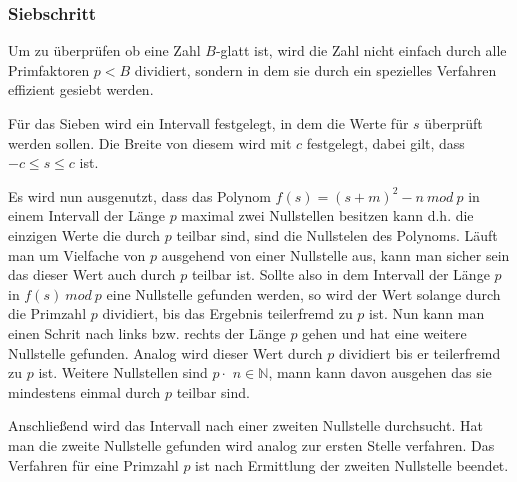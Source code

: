 \documentclass[a4paper,11pt]{article}
\begin{document}
\subsubsection*{Siebschritt}
Um zu überprüfen ob eine Zahl $B$-glatt ist, wird die Zahl nicht
einfach durch alle Primfaktoren $p<B$ dividiert, sondern in
dem sie durch ein spezielles Verfahren effizient gesiebt werden.

Für das Sieben wird ein Intervall festgelegt, in dem die
Werte für $s$ überprüft werden sollen. Die Breite von
diesem wird mit $c$ festgelegt, dabei gilt, dass $-c\leq s \leq c$ ist.

Es wird nun ausgenutzt, dass das Polynom $f(s) = (s+m)^2 - n\ mod\ p$
in einem Intervall der Länge $p$ maximal zwei Nullstellen besitzen
kann d.h. die einzigen Werte die durch $p$ teilbar sind, sind
die Nullstelen des Polynoms. Läuft man um Vielfache von $p$ ausgehend
von einer Nullstelle aus, kann man sicher sein das dieser Wert auch
durch $p$ teilbar ist. Sollte also in dem Intervall der Länge $p$
in $f(s)\ mod \ p$ eine Nullstelle gefunden werden, so wird der
Wert solange durch die Primzahl $p$ dividiert, bis das Ergebnis
teilerfremd zu $p$ ist. Nun kann man einen Schrit nach links bzw.
rechts der Länge $p$ gehen und hat eine weitere Nullstelle gefunden.
Analog wird dieser Wert durch $p$ dividiert bis er teilerfremd zu $p$ ist.
Weitere Nullstellen sind $p\cdotp$ $n\in{\mathbb N}$, mann kann davon
ausgehen das sie mindestens einmal durch $p$ teilbar sind.

Anschließend wird das Intervall nach einer zweiten Nullstelle
durchsucht. Hat man die zweite Nullstelle gefunden wird
analog zur ersten Stelle verfahren. Das Verfahren für eine
Primzahl $p$ ist nach Ermittlung der zweiten Nullstelle
beendet.
\end{document}
